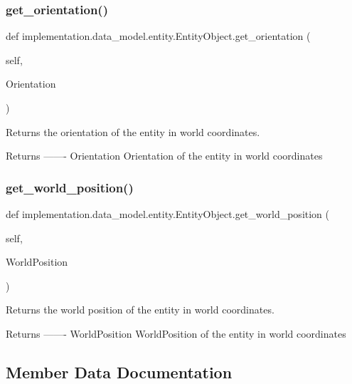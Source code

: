 \subsubsection{\texorpdfstring{get\+\_\+orientation()}{get\_orientation()}}
{\footnotesize\ttfamily def implementation.\+data\+\_\+model.\+entity.\+Entity\+Object.\+get\+\_\+orientation (\begin{DoxyParamCaption}\item[{}]{self,  }\item[{}]{Orientation }\end{DoxyParamCaption})}

\begin{DoxyVerb}Returns the orientation of the entity in world coordinates.

Returns
-------
Orientation
    Orientation of the entity in world coordinates
\end{DoxyVerb}
 \mbox{\label{classimplementation_1_1data__model_1_1entity_1_1_entity_object_a13695fb863c4e98d2c391f70a8373637}} 
\subsubsection{\texorpdfstring{get\+\_\+world\+\_\+position()}{get\_world\_position()}}
{\footnotesize\ttfamily def implementation.\+data\+\_\+model.\+entity.\+Entity\+Object.\+get\+\_\+world\+\_\+position (\begin{DoxyParamCaption}\item[{}]{self,  }\item[{}]{World\+Position }\end{DoxyParamCaption})}

\begin{DoxyVerb}Returns the world position of the entity in world coordinates.

Returns
-------
WorldPosition
    WorldPosition of the entity in world coordinates
\end{DoxyVerb}
 

\subsection{Member Data Documentation}
\mbox{\label{classimplementation_1_1data__model_1_1entity_1_1_entity_object_a83e7ce8061eee760273dc616d92fb54d}} 

